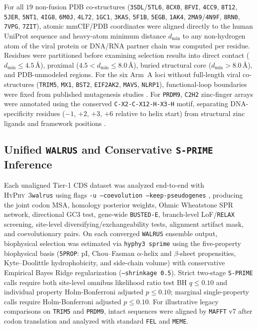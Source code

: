 \documentclass[11pt,letterpaper]{article}
\newcommand{\HyPhyThree}{\textsc{HyPhy~3}\xspace}
\newcommand{\WALRUS}{\texttt{WALRUS}\xspace}
\newcommand{\FEL}{\texttt{FEL}\xspace}
\newcommand{\MEME}{\texttt{MEME}\xspace}
\newcommand{\BUSTEDE}{\texttt{BUSTED-E}\xspace}
\newcommand{\RELAX}{\texttt{RELAX}\xspace}
\newcommand{\SPRIME}{\texttt{S-PRIME}\xspace}
\newcommand{\MAFFT}{\texttt{MAFFT}\xspace}
\begin{document}
For all $19$ non-fusion PDB co-structures (\texttt{3SDL}/\texttt{5TL6}, \texttt{8CX0}, \texttt{8FVI}, \texttt{4CC9}, \texttt{8T12}, \texttt{5JER}, \texttt{5NT1}, \texttt{4IG8}, \texttt{6M0J}, \texttt{4L72}, \texttt{1GC1}, \texttt{3KAS}, \texttt{5F1B}, \texttt{5EGB}, \texttt{1AK4}, \texttt{2MA9}/\texttt{4N9F}, \texttt{8RN0}, \texttt{7VPG}, \texttt{7ZIT}), atomic mmCIF/PDB coordinates were aligned directly to the human UniProt sequence and heavy-atom minimum distance $d_{\min}$ to any non-hydrogen atom of the viral protein or DNA/RNA partner chain was computed per residue. Residues were partitioned before examining selection results into direct contact ($d_{\min} \le 4.5$\,\AA), proximal ($4.5 < d_{\min} \le 8.0$\,\AA), buried structural core ($d_{\min} > 8.0$\,\AA), and PDB-unmodeled regions. For the six Arm~A loci without full-length viral co-structures (\texttt{TRIM5}, \texttt{MX1}, \texttt{BST2}, \texttt{EIF2AK2}, \texttt{MAVS}, \texttt{NLRP1}), functional-loop boundaries were fixed from published mutagenesis studies \citep{tenthorey2020mutational,mitchell2012evolution,mcnatt2009species,elde2009protein,patel2012antagonism,tsu2021diverse}. For \texttt{PRDM9}, \texttt{C2H2} zinc-finger arrays were annotated using the conserved \texttt{C-X2-C-X12-H-X3-H} motif, separating DNA-specificity residues ($-1$, $+2$, $+3$, $+6$ relative to helix start) from structural zinc ligands and framework positions \citep{patel2016prdm9gene}.

\subsection{Unified \WALRUS and Conservative \SPRIME Inference}

Each unaligned Tier-1 CDS dataset was analyzed end-to-end with \HyPhyThree \texttt{walrus} using flags \texttt{-u --coevolution --keep-pseudogenes} \citep{kosakovsky2026walrus}, producing the joint codon MSA, homology posterior weights, Ohmic Wheatstone SPR network, directional GC3 test, gene-wide \BUSTEDE, branch-level LoF/\RELAX screening, site-level diversifying/exchangeability tests, alignment artifact mask, and coevolutionary pairs. On each converged \WALRUS ensemble output, biophysical selection was estimated via \texttt{hyphy3 sprime} using the five-property biophysical basis (\texttt{5PROP}: pI, Chou--Fasman $\alpha$-helix and $\beta$-sheet propensities, Kyte--Doolittle hydrophobicity, and side-chain volume) with conservative Empirical Bayes Ridge regularization (\texttt{--shrinkage 0.5}). Strict two-stage \SPRIME calls require both site-level omnibus likelihood ratio test BH $q \le 0.10$ and individual property Holm-Bonferroni adjusted $p \le 0.10$; marginal single-property calls require Holm-Bonferroni adjusted $p \le 0.10$. For illustrative legacy comparisons on \texttt{TRIM5} and \texttt{PRDM9}, intact sequences were aligned by \MAFFT v7 \citep{katoh2013mafft} after codon translation and analyzed with standard \FEL and \MEME \citep{pond2005not,murrell2012detecting}.
\end{document}
